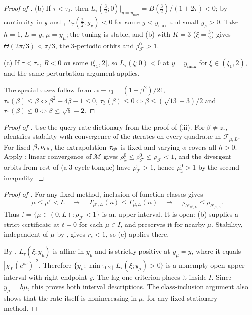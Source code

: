 \documentclass[11pt]{article}
\theoremstyle{definition}
\theoremstyle{remark}
\newcommand{\cF}{\mathcal F}
\newcommand{\cM}{\mathcal M}
\newcommand{\rhoF}{\rho_{\cF}}
\newcommand{\rhoz}{\rho_{\cF}^{0}}
\begin{document}
\begin{proof}[Proof of ]
(b) If \(\tau<\tau_3\), then \(L_\tau(\frac32;0)|_{y=y_{\max}}=B(\frac32)/(1+2\tau)<0\); by
continuity in \(y\) and , \(L_\tau(\frac32;y_\mu)<0\) for some \(y<y_{\max}\)
and small \(y_\mu>0\).  Take \(h=1\), \(L=y\), \(\mu=y_\mu\); the tuning is stable, and
(b) with \(K=3\) (\(\xi=\frac32\)) gives \(\Theta(2\pi/3)<\pi/3\), the \(3\)-periodic orbits and \(\rhoz>1\).

(c) If \(\tau<\tau_*\), \(B<0\) on some \((\xi_1,2]\), so \(L_\tau(\xi;0)<0\) at \(y=y_{\max}\)
for \(\xi\in(\xi_1,2)\), and the same perturbation argument applies.

The special cases follow from \(\tau_*-\tau_3=(1-\beta^2)/24\), \(\tau_*(\beta)\le\beta\iff\beta^2-4\beta-1\le0\),
\(\tau_3(\beta)\le0\iff\beta\le(\sqrt{13}-3)/2\) and \(\tau_*(\beta)\le0\iff\beta\le\sqrt5-2\).
\end{proof}

\begin{proof}[Proof of ]
Use the query-rate dictionary from the proof of (iii).
For \(\beta\ne z_\tau\),  identifies stability with convergence of the iterates
on every quadratic in \(\cF_{\mu,L}\).
For fixed \(\beta,\nu_{\rm qh}\), the extrapolation \(\tau_{\rm qh}\) is fixed and varying \(\alpha\)
covers all \(h>0\).  Apply : linear convergence of \(\cM\) gives
\(\rho^0_{\tilde x}\le\rhoz\le\rhoF<1\), and the divergent orbits from rest of  (a \(3\)-cycle
tongue) have \(\rhoz>1\), hence \(\rho^0_{\tilde x}>1\) by the second inequality.
\end{proof}

%
%
%
%
%
%
%
%
%
%
%
%
%
%
%
%
%
%
%
%
%
%
%
%
%
%

\begin{proof}[Proof of ]
For any fixed method, inclusion of function classes gives
\[
\mu\le\mu'<L
\quad\Longrightarrow\quad
\Gamma_{\mu',L}(n)\le\Gamma_{\mu,L}(n)
\quad\Longrightarrow\quad
\rho_{\cF_{\mu',L}}\le\rho_{\cF_{\mu,L}}.
\]
Thus \(I=\{\mu\in(0,L):\rhoF<1\}\) is an upper interval.
It is open: (b) supplies a strict certificate at \(t=0\)
for each \(\mu\in I\), and  preserves it for nearby
\(\mu\).  Stability, independent of \(\mu\) by ,
gives \(r_c<1\), so (c) applies there.

By , \(L_\tau(\xi;y_\mu)\) is affine in \(y_\mu\)
and is strictly positive at \(y_\mu=y\), where it equals
\(|\chi_L(e^{i\omega})|^2\).  Therefore
\(\{y_\mu:\min_{[0,2]}L_\tau(\xi;y_\mu)>0\}\) is a nonempty open
upper interval with right endpoint \(y\).  The lag-one criterion
places it inside \(I\).  Since \(y_\mu=h\mu\), this proves both
interval descriptions.  The class-inclusion argument also shows that
the rate itself is nonincreasing in \(\mu\), for any fixed stationary
method.
\end{proof}
\end{document}
